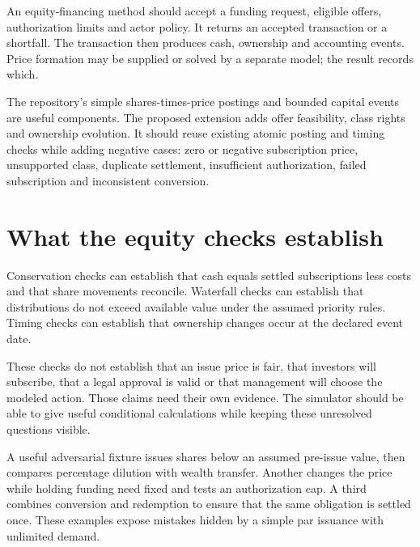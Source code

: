 An equity-financing method should accept a funding request, eligible offers, authorization limits and actor policy. It returns an accepted transaction or a shortfall. The transaction then produces cash, ownership and accounting events. Price formation may be supplied or solved by a separate model; the result records which.

The repository's simple shares-times-price postings and bounded capital events are useful components. The proposed extension adds offer feasibility, class rights and ownership evolution. It should reuse existing atomic posting and timing checks while adding negative cases: zero or negative subscription price, unsupported class, duplicate settlement, insufficient authorization, failed subscription and inconsistent conversion.

\section{What the equity checks establish}
Conservation checks can establish that cash equals settled subscriptions less costs and that share movements reconcile. Waterfall checks can establish that distributions do not exceed available value under the assumed priority rules. Timing checks can establish that ownership changes occur at the declared event date.

These checks do not establish that an issue price is fair, that investors will subscribe, that a legal approval is valid or that management will choose the modeled action. Those claims need their own evidence. The simulator should be able to give useful conditional calculations while keeping these unresolved questions visible.

A useful adversarial fixture issues shares below an assumed pre-issue value, then compares percentage dilution with wealth transfer. Another changes the price while holding funding need fixed and tests an authorization cap. A third combines conversion and redemption to ensure that the same obligation is settled once. These examples expose mistakes hidden by a simple par issuance with unlimited demand.

